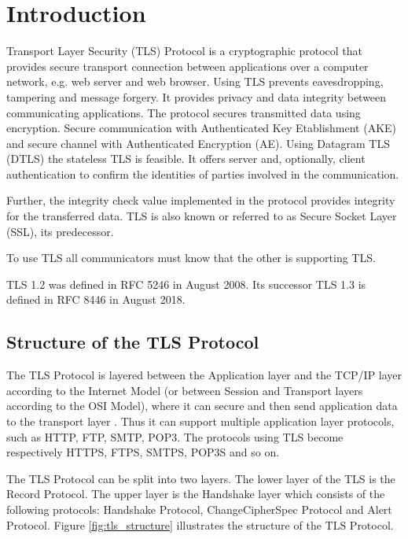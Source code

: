 \chapter{Introduction}
\label{chap:introduction}

Transport Layer Security (TLS) Protocol is a cryptographic protocol that provides secure transport connection between applications over a computer network, e.g. web server and web browser. 
Using TLS prevents eavesdropping, tampering and message forgery. It provides privacy and data integrity between communicating applications. The protocol secures transmitted data using encryption. Secure communication with Authenticated Key Etablishment (AKE) and secure channel with Authenticated Encryption (AE). 
Using Datagram TLS (DTLS) the stateless TLS is feasible. It offers server and, optionally, client authentication to confirm the identities of parties involved in the communication. 
 
Further, the integrity check value implemented in the protocol provides integrity for the transferred data. TLS is also known or referred to as Secure Socket Layer (SSL), its predecessor. 
 
To use TLS all communicators must know that the other is supporting TLS.

TLS 1.2 was defined in RFC 5246 in August 2008. Its successor TLS 1.3 is defined in RFC 8446 in August 2018.
 \cite{RFC5246}

\section{Structure of the TLS Protocol}
\label{sec:stucture}

The TLS Protocol is layered between the Application layer and the TCP/IP layer according to the Internet Model (or between Session and Transport layers according to the OSI Model), where it can secure and then send application data to the transport layer \cite{ms:overview}. Thus it can support multiple application layer protocols, such as HTTP, FTP, SMTP, POP3. The protocols using TLS become respectively HTTPS, FTPS, SMTPS, POP3S and so on.

The TLS Protocol can be split into two layers. The lower layer of the TLS is the Record Protocol. The upper layer is the Handshake layer which consists of the following protocols: Handshake Protocol, ChangeCipherSpec Protocol and Alert Protocol. Figure \ref{fig:tls_structure} illustrates the structure of the TLS Protocol. 


